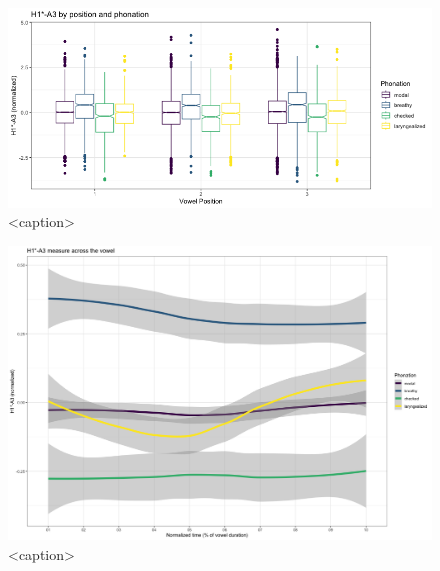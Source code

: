 \documentclass[12pt, letterpaper]{article}
\begin{document}
\begin{figure}[htbp]
  \centering
  \includegraphics[width = \linewidth]{Images/h1a3_boxplot.png}
  \caption{<caption>}
  \label{fig:H1A3_box}
\end{figure}

\begin{figure}[htbp]
  \centering
  \includegraphics[width = \linewidth]{Images/h1a3_line.png}
  \caption{<caption>}
  \label{fig:H1A3_line}
\end{figure}
\end{document}

